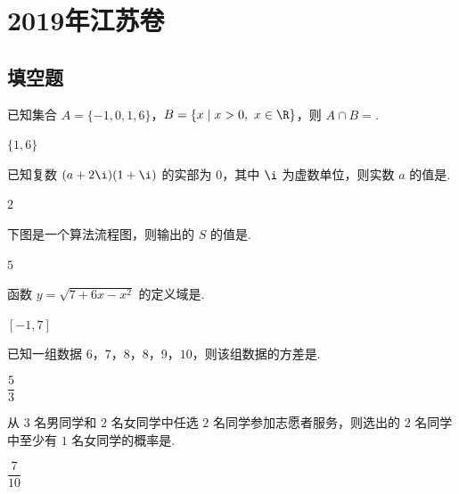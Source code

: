 \chapter{2019年江苏卷}

\section{填空题}

\begin{problem}
已知集合 \(A=\{-1,0,1,6\}\)，\(B=\{x\mid x>0,\ x\in\R\}\)，则 \(A\cap B=\)\fillinblank{}.

\begin{answer}
\(\{1,6\}\)
\end{answer}
\end{problem}

\begin{problem}
已知复数 \((a+2\i)(1+\i)\) 的实部为 \(0\)，其中 \(\i\) 为虚数单位，则实数 \(a\) 的值是\fillinblank{}.

\begin{answer}
\(2\)
\end{answer}
\end{problem}

\begin{problem}
下图是一个算法流程图，则输出的 \(S\) 的值是\fillinblank{}.


\begin{answer}
\(5\)
\end{answer}
\end{problem}

\begin{problem}
函数 \(y=\sqrt{7+6x-x^2}\) 的定义域是\fillinblank{}.

\begin{answer}
\([-1,7]\)
\end{answer}
\end{problem}

\begin{problem}
已知一组数据 \(6\)，\(7\)，\(8\)，\(8\)，\(9\)，\(10\)，则该组数据的方差是\fillinblank{}.

\begin{answer}
\(\dfrac{5}{3}\)
\end{answer}
\end{problem}

\begin{problem}
从 \(3\) 名男同学和 \(2\) 名女同学中任选 \(2\) 名同学参加志愿者服务，则选出的 \(2\) 名同学中至少有 \(1\) 名女同学的概率是\fillinblank{}.

\begin{answer}
\(\dfrac{7}{10}\)
\end{answer}
\end{problem}


